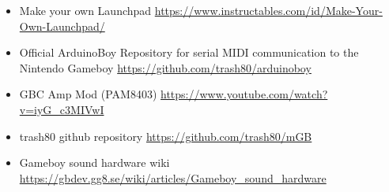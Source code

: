 \documentclass{article}
\begin{document}
\begin{itemize}

    \item Make your own Launchpad
            \url{https://www.instructables.com/id/Make-Your-Own-Launchpad/}

    \item Official ArduinoBoy Repository for serial MIDI communication to the Nintendo Gameboy 
            \url{https://github.com/trash80/arduinoboy}

    \item GBC Amp Mod (PAM8403)
            \url{https://www.youtube.com/watch?v=iyG_c3MIVwI}

    \item trash80 github repository 
            \url{https://github.com/trash80/mGB }
            
    \item Gameboy sound hardware wiki
            \url{https://gbdev.gg8.se/wiki/articles/Gameboy_sound_hardware}
    
\end{itemize}
\end{document}
